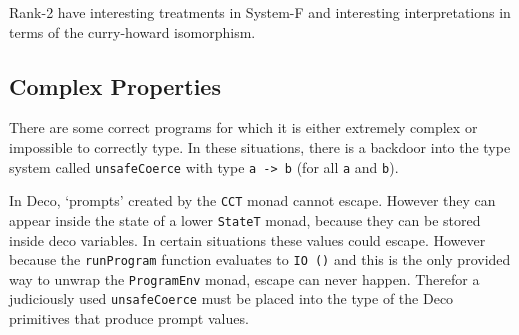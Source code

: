 \documentclass[]{article}
\newcommand{\function}[1]{\texttt{#1}}
\newcommand{\type}[1]{\texttt{#1}}
\begin{document}
Rank-2 have interesting treatments in System-F and interesting interpretations
in terms of the curry-howard isomorphism.

\subsection{Complex Properties}
\label{discussion:unsafecast}

There are some correct programs for which it is either extremely
complex or impossible to correctly type. In these situations,
there is a backdoor into the type system called \function{unsafeCoerce}
with type \type{a -> b} (for all \type{a} and \type{b}).

In Deco, `prompts' created by the \type{CCT} monad cannot escape. However they
can appear inside the state of a lower \type{StateT} monad, because they can
be stored inside deco variables. In certain situations these values could
escape. However because the \function{runProgram} function evaluates to
\type{IO ()} and this is the only provided way to unwrap the \type{ProgramEnv}
monad, escape can never happen. Therefor a judiciously used
\function{unsafeCoerce} must be placed into the type of the Deco primitives
that produce prompt values.



%
%
\end{document}
